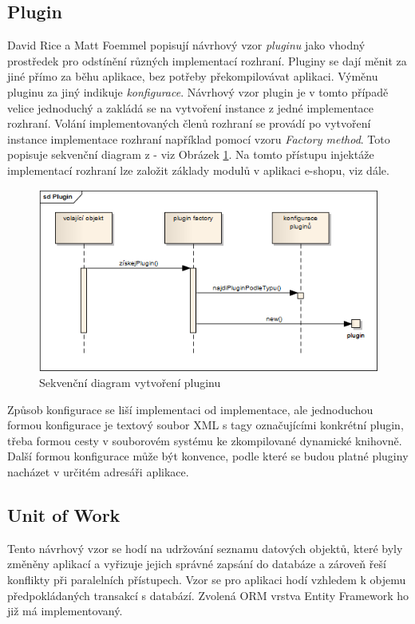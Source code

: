 \documentclass[11pt,twoside,a4paper]{book}
\begin{document}
\subsection{Plugin}
David Rice a Matt Foemmel popisují návrhový vzor \textit{pluginu} jako vhodný prostředek pro odstínění různých implementací rozhraní. Pluginy se dají měnit za jiné přímo za běhu aplikace, bez potřeby překompilovávat aplikaci. Výměnu pluginu za jiný indikuje \textit{konfigurace}. Návrhový vzor plugin je v tomto případě velice jednoduchý a zakládá se na vytvoření instance z jedné implementace rozhraní. Volání implementovaných členů rozhraní se provádí po vytvoření instance implementace rozhraní například pomocí vzoru \textit{Factory method}. Toto popisuje sekvenční diagram z \cite{PEAA} - viz Obrázek \ref{fig:pluginseq}. Na tomto přístupu injektáže implementací rozhraní lze založit základy modulů v aplikaci e-shopu, viz dále.

\begin{figure}[h!]
\begin{center}
\includegraphics[scale=0.7]{figures/pluginseq}
\caption{Sekvenční diagram vytvoření pluginu}
\label{fig:pluginseq}
\end{center}
\end{figure}

Způsob konfigurace se liší implementaci od implementace, ale jednoduchou formou konfigurace je textový soubor XML s tagy označujícími konkrétní plugin, třeba formou cesty v souborovém systému ke zkompilované dynamické knihovně. Další formou konfigurace může být konvence, podle které se budou platné pluginy nacházet v určitém adresáři aplikace.

\subsection{Unit of Work}
Tento návrhový vzor se hodí na udržování seznamu datových objektů, které byly změněny aplikací a vyřizuje jejich správné zapsání do databáze a zároveň řeší konflikty při paralelních přístupech. Vzor se pro aplikaci hodí vzhledem k objemu předpokládaných transakcí s databází. Zvolená ORM vrstva \textsf{Entity Framework} ho již má implementovaný.
\end{document}
